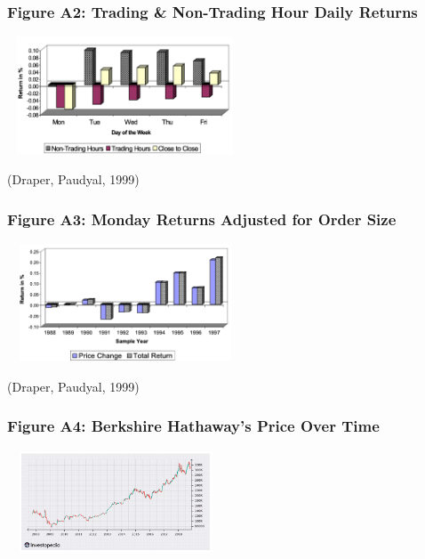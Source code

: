 \documentclass[11pt, english]{article}
\begin{document}
		\subsubsection*{Figure A2: Trading \& Non-Trading Hour Daily Returns}

			\begin{center}
                                \includegraphics[width=7cm,height=3.5cm]{A2.png}
                        \end{center}

			(Draper, Paudyal, 1999)

		\subsubsection*{Figure A3: Monday Returns Adjusted for Order Size}
                        
                        \begin{center}
                                \includegraphics[width=7cm,height=3.5cm]{A3.png}
                        \end{center}

                        (Draper, Paudyal, 1999)

		\subsubsection*{Figure A4: Berkshire Hathaway’s Price Over Time}   
                        
                        \begin{center}
                                \includegraphics[width=6.5cm,height=3cm]{A4.png}
                        \end{center}
\end{document}
